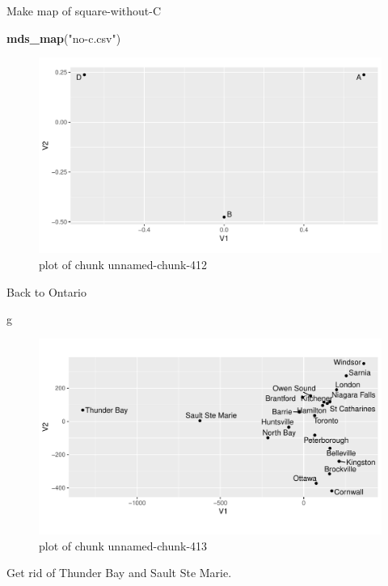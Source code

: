 \documentclass[ignorenonframetext,]{beamer}
\newenvironment{Shaded}{\begin{snugshade}}{\end{snugshade}}
\newcommand{\KeywordTok}[1]{\textcolor[rgb]{0.13,0.29,0.53}{\textbf{#1}}}
\newcommand{\NormalTok}[1]{#1}
\newcommand{\StringTok}[1]{\textcolor[rgb]{0.31,0.60,0.02}{#1}}
\begin{document}
\begin{frame}[fragile]{Make map of square-without-C}
\protect\hypertarget{make-map-of-square-without-c}{}

\begin{Shaded}
\begin{Highlighting}[]
\KeywordTok{mds_map}\NormalTok{(}\StringTok{"no-c.csv"}\NormalTok{)}
\end{Highlighting}
\end{Shaded}

\begin{figure}
\centering
\includegraphics{figure/unnamed-chunk-412-1.pdf}
\caption{plot of chunk unnamed-chunk-412}
\end{figure}

\end{frame}

\begin{frame}[fragile]{Back to Ontario}
\protect\hypertarget{back-to-ontario}{}

\begin{Shaded}
\begin{Highlighting}[]
\NormalTok{g}
\end{Highlighting}
\end{Shaded}

\begin{figure}
\centering
\includegraphics{figure/unnamed-chunk-413-1.pdf}
\caption{plot of chunk unnamed-chunk-413}
\end{figure}

Get rid of Thunder Bay and Sault Ste Marie.

\end{frame}
\end{document}
